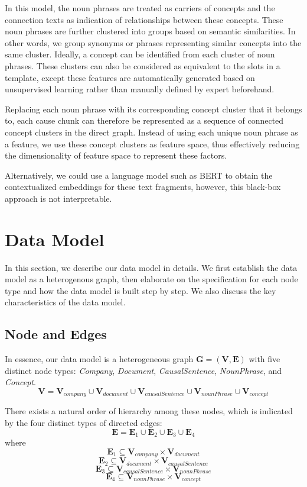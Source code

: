 In this model, the noun phrases are treated as carriers of concepts and the connection texts as indication of relationships between these concepts. These noun phrases are further clustered into groups based on semantic similarities. In other words, we group synonyms or phrases representing similar concepts into the same cluster. Ideally, a concept can be identified from each cluster of noun phrases. These clusters can also be considered as equivalent to the slots in a template, except these features are automatically generated based on unsupervised learning rather than manually defined by expert beforehand. 

Replacing each noun phrase with its corresponding concept cluster that it belongs to, each cause chunk can therefore be represented as a sequence of connected concept clusters in the direct graph. Instead of using each unique noun phrase as a feature, we use these concept clusters as feature space, thus effectively reducing the dimensionality of feature space to represent these factors. 

Alternatively, we could use a language model such as BERT to obtain the contextualized embeddings for these text fragments, however, this black-box approach is not interpretable. 




\section{Data Model} \label{sec:datamodel}

In this section, we describe our data model in details. We first establish the data model as a heterogenous graph, then elaborate on the specification for each node type and how the data model is built step by step. We also discuss the key characteristics of the data model. 

\subsection{Node and Edges}

In essence, our data model is a heterogeneous graph $\mathbf{G} = (\mathbf{V}, \mathbf{E})$ with five distinct node types: \emph{Company}, \emph{Document}, \emph{CausalSentence}, \emph{NounPhrase}, and \emph{Concept}.
\[\mathbf{V} = \mathbf{V}_{company} \cup \mathbf{V}_{document} \cup \mathbf{V}_{causalSentence} \cup \mathbf{V}_{nounPhrase} \cup \mathbf{V}_{concept} \]

There exists a natural order of hierarchy among these nodes, which is indicated by the four distinct types of directed edges:
\[\mathbf{E} = \mathbf{E}_1 \cup \mathbf{E}_2 \cup \mathbf{E}_3 \cup \mathbf{E}_4 \] where 
\[\mathbf{E}_1 \subseteq \mathbf{V}_{company} \times \mathbf{V}_{document} \]
\[\mathbf{E}_2 \subseteq \mathbf{V}_{document} \times \mathbf{V}_{causalSentence} \]
\[\mathbf{E}_3 \subseteq \mathbf{V}_{causalSentence} \times \mathbf{V}_{nounPhrase} \]
\[\mathbf{E}_4 \subseteq \mathbf{V}_{nounPhrase} \times \mathbf{V}_{concept} \]


